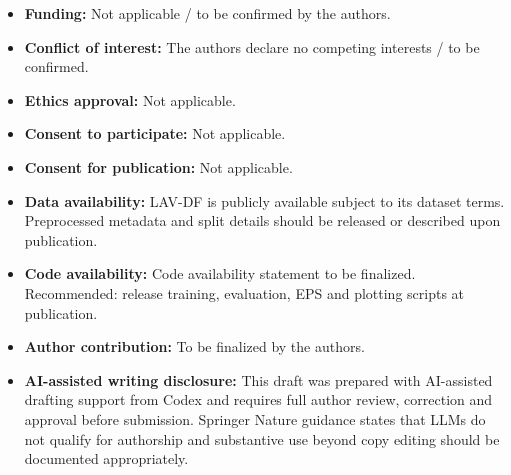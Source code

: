 \documentclass[pdflatex,sn-basic,Numbered]{sn-jnl}
\begin{document}
\begin{itemize}
    \item \textbf{Funding:} Not applicable / to be confirmed by the authors.
    \item \textbf{Conflict of interest:} The authors declare no competing interests / to be confirmed.
    \item \textbf{Ethics approval:} Not applicable.
    \item \textbf{Consent to participate:} Not applicable.
    \item \textbf{Consent for publication:} Not applicable.
    \item \textbf{Data availability:} LAV-DF is publicly available subject to its dataset terms. Preprocessed metadata and split details should be released or described upon publication.
    \item \textbf{Code availability:} Code availability statement to be finalized. Recommended: release training, evaluation, EPS and plotting scripts at publication.
    \item \textbf{Author contribution:} To be finalized by the authors.
    \item \textbf{AI-assisted writing disclosure:} This draft was prepared with AI-assisted drafting support from Codex and requires full author review, correction and approval before submission. Springer Nature guidance states that LLMs do not qualify for authorship and substantive use beyond copy editing should be documented appropriately.
\end{itemize}
\end{document}
